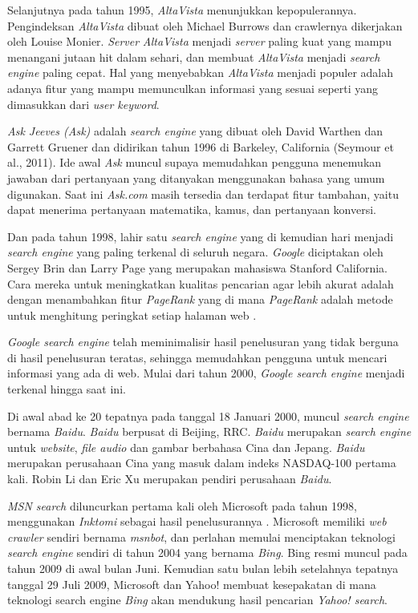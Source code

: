 Selanjutnya pada tahun 1995, \textit{AltaVista} menunjukkan kepopulerannya. Pengindeksan \textit{AltaVista} dibuat oleh Michael Burrows dan crawlernya dikerjakan oleh Louise Monier. \textit{Server} \textit{AltaVista} menjadi \textit{server} paling kuat yang mampu menangani jutaan hit dalam sehari, dan membuat \textit{AltaVista} menjadi \textit{search engine} paling cepat. Hal yang menyebabkan \textit{AltaVista} menjadi populer adalah adanya fitur yang mampu memunculkan informasi yang sesuai seperti yang dimasukkan dari \textit{user keyword}.

\textit{Ask Jeeves (Ask)} adalah \textit{search engine} yang dibuat oleh David Warthen dan Garrett Gruener dan didirikan tahun 1996 di Barkeley, California (Seymour et al., 2011). Ide awal \textit{Ask} muncul supaya memudahkan pengguna menemukan jawaban dari pertanyaan yang ditanyakan menggunakan bahasa yang umum digunakan. Saat ini \textit{Ask.com} masih tersedia dan terdapat fitur tambahan, yaitu dapat menerima pertanyaan matematika, kamus, dan pertanyaan konversi.

Dan pada tahun 1998, lahir satu \textit{search engine} yang di kemudian hari menjadi \textit{search engine} yang paling terkenal di seluruh negara. \textit{Google} diciptakan oleh Sergey Brin dan Larry Page yang merupakan mahasiswa Stanford California. Cara mereka untuk meningkatkan kualitas pencarian agar lebih akurat adalah dengan menambahkan fitur \textit{PageRank} yang di mana \textit{PageRank} adalah metode untuk menghitung peringkat setiap halaman web \citep{page1999pagerank}.

\textit{Google search engine} telah meminimalisir hasil penelusuran yang tidak berguna di hasil penelusuran teratas, sehingga memudahkan pengguna untuk mencari informasi yang ada di web. Mulai dari tahun 2000, \textit{Google search engine} menjadi terkenal hingga saat ini.

Di awal abad ke 20 tepatnya pada tanggal 18 Januari 2000, muncul \textit{search engine} bernama \textit{Baidu}. \textit{Baidu} berpusat di Beijing, RRC. \textit{Baidu} merupakan \textit{search engine} untuk \textit{website}, \textit{file audio} dan gambar berbahasa Cina dan Jepang. \textit{Baidu} merupakan perusahaan Cina yang masuk dalam indeks NASDAQ-100 pertama kali. Robin Li dan Eric Xu merupakan pendiri perusahaan \textit{Baidu}.

\textit{MSN search} diluncurkan pertama kali oleh Microsoft pada tahun 1998, menggunakan \textit{Inktomi} sebagai hasil penelusurannya \citep{seymour2011history}. Microsoft memiliki \textit{web crawler} sendiri bernama \textit{msnbot}, dan perlahan memulai menciptakan teknologi \textit{search engine} sendiri di tahun 2004 yang bernama \textit{Bing}. Bing resmi muncul pada tahun 2009 di awal bulan Juni. Kemudian satu bulan lebih setelahnya tepatnya tanggal 29 Juli 2009, Microsoft dan Yahoo! membuat kesepakatan di mana teknologi search engine \textit{Bing} akan mendukung hasil pencarian \textit{Yahoo! search}.

